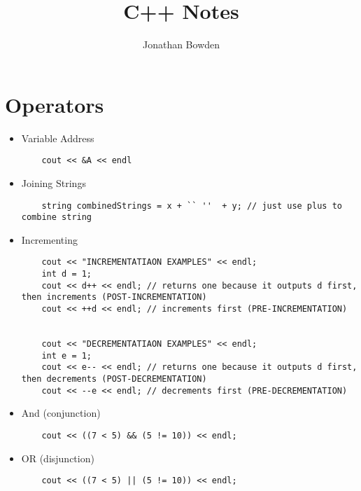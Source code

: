 \documentclass{article}
\title{C++ Notes}
\author{Jonathan Bowden}
\begin{document}


\maketitle

\section{Operators}

\begin{itemize}
\item Variable Address

\begin{lstlisting}
	cout << &A << endl
\end{lstlisting}

\item Joining Strings

\begin{lstlisting}
	string combinedStrings = x + `` ''  + y; // just use plus to combine string
\end{lstlisting}

\item{Incrementing}

\begin{lstlisting}
	cout << "INCREMENTATIAON EXAMPLES" << endl;
	int d = 1;
	cout << d++ << endl; // returns one because it outputs d first, then increments (POST-INCREMENTATION)
	cout << ++d << endl; // increments first (PRE-INCREMENTATION)


	cout << "DECREMENTATIAON EXAMPLES" << endl;
	int e = 1;
	cout << e-- << endl; // returns one because it outputs d first, then decrements (POST-DECREMENTATION)
	cout << --e << endl; // decrements first (PRE-DECREMENTATION)
\end{lstlisting}

\item And (conjunction)
\begin{lstlisting}
	cout << ((7 < 5) && (5 != 10)) << endl;
\end{lstlisting}

\item OR (disjunction)

\begin{lstlisting}
	cout << ((7 < 5) || (5 != 10)) << endl;
\end{lstlisting}


\end{itemize}
\end{document}
